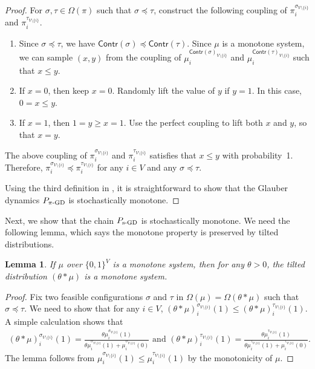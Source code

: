 \documentclass[11pt,a4paper]{article}
\newcommand{\psim}{P_{\textnormal{s-GD}}}
\newtheorem{lemma}[theorem]{Lemma}
\theoremstyle{definition}
\begin{document}
\begin{proof}
For $\sigma, \tau \in \Omega(\pi)$ such that $\sigma\preceq \tau$, construct the following coupling of $\pi^{\sigma_{V \setminus \{i\}}}_i$ and $\pi^{\tau_{V \setminus \{i\}}}_i$.
\begin{enumerate}
    \item Since $\sigma \preceq \tau$, we have $\textsf{Contr}(\sigma) \preceq \textsf{Contr}(\tau)$. Since $\mu$ is a monotone system, we can sample $(x,y)$ from the coupling of $\mu^{\textsf{Contr}(\sigma)_{V \setminus \{i\}}}_i$ and $\mu^{\textsf{Contr}(\tau)_{V \setminus \{i\}}}_i$ such that  $x \leq y$.
    \item If $x= 0$, then keep $x = 0$. Randomly lift the value of $y$ if $y = 1$. In this case, $0 = x \leq y$.
    \item If $x = 1$, then $1 = y \geq x = 1$. Use the perfect coupling to lift both $x$ and $y$, so that $x = y$.
\end{enumerate}
The above coupling of $\pi^{\sigma_{V \setminus \{i\}}}_i$ and $\pi^{\tau_{V \setminus \{i\}}}_i$ satisfies that $x \leq y$ with probability~1. Therefore, $\pi^{\sigma_{V \setminus \{i\}}}_i \preceq \pi^{\tau_{V \setminus \{i\}}}_i$ for any $i \in V$ and any  $\sigma \preceq \tau$. 

Using the third definition in , it is straightforward to show that the Glauber dynamics $P_{\pi\textnormal{-GD}}$ is stochastically monotone.
\end{proof}

Next, we show that the chain $\psim$ is stochastically monotone. We need the following lemma, which says the monotone property is preserved by tilted distributions.
\begin{lemma}\label{lem:monotone-pi-sgd}
If $\mu$ over $\{0,1\}^V$ is a monotone system, then for any $\theta > 0$, the tilted distribution $(\theta * \mu)$ is a monotone system.
\end{lemma}
\begin{proof}
Fix two feasible configurations $\sigma$ and $\tau$ in $\Omega(\mu) = \Omega(\theta * \mu)$ such that $\sigma\preceq \tau$. We need to show that for any $i \in V$, $(\theta * \mu)^{\sigma_{V \setminus \{i\}}}_i(1) \leq (\theta * \mu)^{\tau_{V \setminus \{i\}}}_i(1)$. A simple calculation shows that
\begin{align}\label{eq:theta-mu-monotone}
    (\theta * \mu)^{\sigma_{V \setminus \{i\}}}_i(1) = \frac{\theta \mu^{\sigma_{V \setminus \{i\}}}_i(1)}{\theta \mu^{\sigma_{V \setminus \{i\}}}_i(1) + \mu^{\sigma_{V \setminus \{i\}}}_i(0)} \text{ and } (\theta * \mu)^{\tau_{V \setminus \{i\}}}_i(1) = \frac{\theta \mu^{\tau_{V \setminus \{i\}}}_i(1)}{\theta \mu^{\tau_{V \setminus \{i\}}}_i(1) + \mu^{\tau_{V \setminus \{i\}}}_i(0)}.
\end{align}
The lemma follows from $\mu^{\sigma_{V \setminus \{i\}}}_i(1) \leq \mu^{\tau_{V \setminus \{i\}}}_i(1)$ by the monotonicity of $\mu$.
\end{proof}
\end{document}
